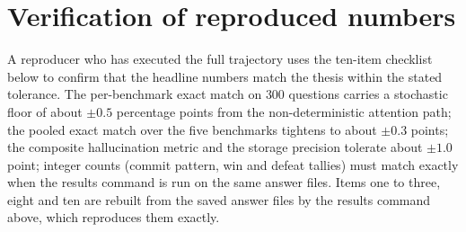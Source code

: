 \section{Verification of reproduced numbers}
\label{app:repro-verify}

A reproducer who has executed the full trajectory uses the ten-item checklist below to confirm that the headline numbers match the thesis within the stated tolerance. The per-benchmark exact match on $300$ questions carries a stochastic floor of about $\pm 0.5$ percentage points from the non-deterministic attention path; the pooled exact match over the five benchmarks tightens to about $\pm 0.3$ points; the composite hallucination metric and the storage precision tolerate about $\pm 1.0$ point; integer counts (commit pattern, win and defeat tallies) must match exactly when the results command is run on the same answer files. Items one to three, eight and ten are rebuilt from the saved answer files by the results command above, which reproduces them exactly.

